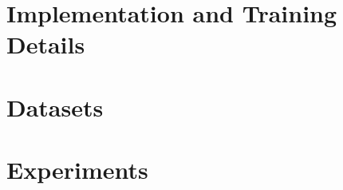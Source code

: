 \documentclass{scrartcl}
\begin{document}
%
%
%
%

\newpage 
\section{Implementation and Training Details}
\label{sec:details}

\section{Datasets}
\label{sec:details}

\newpage
\section{Experiments}
\label{sec:experiments}

\end{document}
